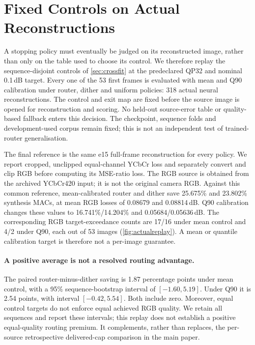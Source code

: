 \section{Fixed Controls on Actual Reconstructions}
\label{sec:actualreplay}

A stopping policy must eventually be judged on its reconstructed image,
rather than only on the table used to choose its control. We therefore
replay the sequence-disjoint controls of \cref{sec:crossfit} at the
predeclared QP32 and nominal 0.1\,dB target. Every one of the 53 first frames
is evaluated with mean and Q90 calibration under router, dither and uniform
policies: 318 actual neural reconstructions. The control and exit map are
fixed before the source image is opened for reconstruction and scoring.
No held-out source-error table or quality-based fallback enters this decision.
The checkpoint, sequence folds and development-used corpus remain fixed;
this is not an independent test of trained-router generalisation.

The final reference is the same e15 full-frame reconstruction for every
policy. We report cropped, unclipped equal-channel YCbCr loss and separately
convert and clip RGB before computing its MSE-ratio loss. The RGB source is
obtained from the archived YCbCr420 input; it is not the original camera RGB.
Against this common reference, mean-calibrated router and dither save
25.675\% and 23.802\% synthesis MACs, at mean RGB losses of 0.08679 and
0.08814\,dB. Q90 calibration changes these values to 16.741\%/14.204\%
and 0.05684/0.05636\,dB. The corresponding RGB target-exceedance counts
are 17/16 under mean control and 4/2 under Q90, each out of 53 images
(\cref{fig:actualreplay}). A mean or quantile calibration target is therefore
not a per-image guarantee.

\paragraph{A positive average is not a resolved routing advantage.}
The paired router-minus-dither saving is 1.87 percentage points under mean
control, with a 95\% sequence-bootstrap interval of $[-1.60,5.19]$.
Under Q90 it is 2.54 points, with interval $[-0.42,5.54]$.
Both include zero. Moreover, equal control targets do not enforce equal
achieved RGB quality. We retain all sequences and report these intervals;
this replay does not establish a positive equal-quality routing premium.
It complements, rather than replaces, the per-source retrospective
delivered-cap comparison in the main paper.

